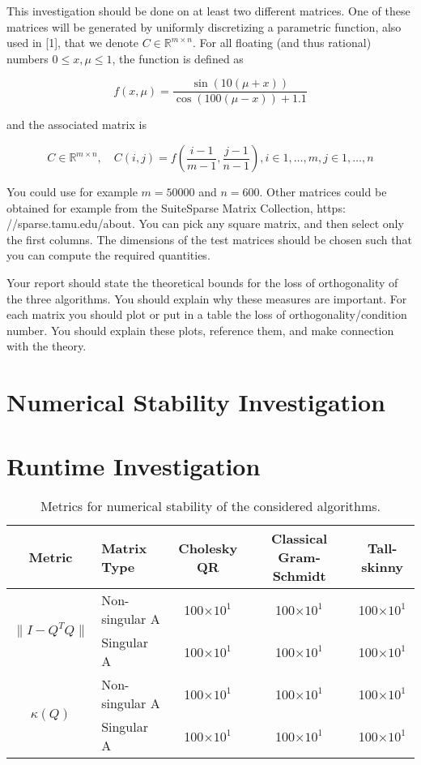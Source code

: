 \documentclass[a4paper, 12pt,oneside]{article}
\begin{document}
		This investigation should be done on at least two different matrices. One of these matrices will be generated by uniformly discretizing a parametric function, also used in [1], that we denote $C \in \mathbb{R}^{m \times n}$. For all floating (and thus rational) numbers $0 \leq x, \mu \leq 1$, the function is defined as
		
		$$
		f(x, \mu)=\frac{\sin (10(\mu+x))}{\cos (100(\mu-x))+1.1}
		$$
		
		and the associated matrix is
		
		$$
		C \in \mathbb{R}^{m \times n}, \quad C(i, j)=f\left(\frac{i-1}{m-1}, \frac{j-1}{n-1}\right), i \in 1, \ldots, m, j \in 1, \ldots, n
		$$
		
		
		You could use for example $m=50000$ and $n=600$.
		Other matrices could be obtained for example from the SuiteSparse Matrix Collection, https: //sparse.tamu.edu/about. You can pick any square matrix, and then select only the first columns. The dimensions of the test matrices should be chosen such that you can compute the required quantities.
		
		Your report should state the theoretical bounds for the loss of orthogonality of the three algorithms. You should explain why these measures are important. For each matrix you should plot or put in a table the loss of orthogonality/condition number. You should explain these plots, reference them, and make connection with the theory.
	\section{Numerical Stability Investigation}
	\section{Runtime Investigation}
\begin{table}[]
	\centering
	\begin{tabular}{|c|l|c|c|c|}
	\hline
	Metric                            & Matrix Type & Cholesky QR & Classical Gram-Schmidt & Tall-skinny     \\ \hline
	\multirow{2}{*}{$\|I-Q^TQ\|$}    & Non-singular A  & 100$\times 10^1$       & 100$\times 10^1$ & 100$\times 10^1$ \\ \cline{2-5} 
									  & Singular A      & 100$\times 10^1$       & 100$\times 10^1$ & 100$\times 10^1$ \\ \hline
	\multirow{2}{*}{$\kappa(Q)$} & Non-singular A  & 100$\times 10^1$       & 100$\times 10^1$ & 100$\times 10^1$ \\ \cline{2-5} 
									  & Singular A      & 100$\times 10^1$       & 100$\times 10^1$ & 100$\times 10^1$ \\ \hline
	\end{tabular}
	\caption{Metrics for numerical stability of the considered algorithms.}
	\label{tab:numberical-stability}
	\end{table}
\end{document}

